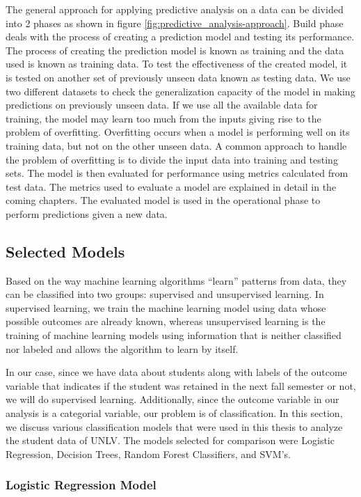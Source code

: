 \documentclass[11pt,openright]{report}
\begin{document}
The general approach for applying predictive analysis on a data can be divided into 2 phases as shown in figure \ref{fig:predictive_analysis-approach}. Build phase deals with the process of creating a prediction model and testing its performance. The process of creating the prediction model is known as training and the data used is known as training data. To test the effectiveness of the created model, it is tested on another set of previously unseen data known as testing data. We use two different datasets to check the generalization capacity of the model in making predictions on previously unseen data. If we use all the available data for training, the model may learn too much from the inputs giving rise to the problem of overfitting. Overfitting occurs when a model is performing well on its training data, but not on the other unseen data. A common approach to handle the problem of overfitting is to divide the input data into training and testing sets. The model is then evaluated for performance using metrics calculated from test data. The metrics used to evaluate a model are explained in detail in the coming chapters. The evaluated model is used in the operational phase to perform predictions given a new data. 

\subsection{Selected Models}
Based on the way machine learning algorithms ``learn'' patterns from data, they can be classified into two groups: supervised and unsupervised learning. In supervised learning, we train the machine learning model using data whose possible outcomes are already known, whereas unsupervised learning is the training of machine learning models using information that is neither classified nor labeled and allows the algorithm to learn by itself. 

In our case, since we have data about students along with labels of the outcome variable that indicates if the student was retained in the next fall semester or not, we will do supervised learning. Additionally, since the outcome variable in our analysis is a categorial variable, our problem is of classification. In this section, we discuss various classification models that were used in this thesis to analyze the student data of UNLV. The models selected for comparison were Logistic Regression, Decision Trees, Random Forest Classifiers, and SVM's.

\subsubsection {Logistic Regression Model} \label{sssec:lr}
\end{document}
